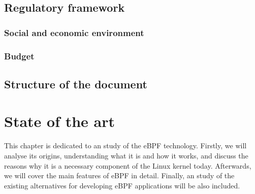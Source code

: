 \documentclass[12pt]{report} %
\begin{document}
\section{Regulatory framework}


\subsection{Social and economic environment}


\subsection{Budget}

\section{Structure of the document}


%

\chapter{State of the art}
This chapter is dedicated to an study of the eBPF technology. Firstly, we will analyse its origins, understanding what it is and how it works, and discuss the reasons why it is a necessary component of the Linux kernel today. Afterwards, we will cover the main features of eBPF in detail. Finally, an study of the existing alternatives for developing eBPF applications will be also included.
\end{document}
